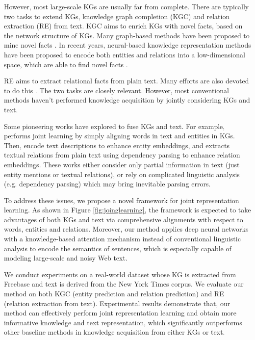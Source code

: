 \documentclass[11pt,a4paper]{article}
\begin{document}
However, most large-scale KGs are usually far from complete. There are typically two tasks to extend KGs, knowledge graph completion (KGC) and relation extraction (RE) from text. KGC aims to enrich KGs with novel facts, based on the network structure of KGs. Many graph-based methods have been proposed to mine novel facts \cite{lao2011random,lao2010relational}. In recent years, neural-based knowledge representation methods have been proposed to encode both entities and relations into a low-dimensional space, which are able to find novel facts \cite{bordes2013translating,wang2014transh,lin2015learning,ji2015knowledge,he2015learning,xiao2015transg,ji2016knowledge}. 

RE aims to extract relational facts from plain text. Many efforts are also devoted to do this \cite{surdeanu2012multi,riedel2013relation,min2013distant,zeng2014relation,zeng2015distant,lin2016neural,zeng2016incorporating}. The two tasks are closely relevant. However, most conventional methods haven't performed knowledge acquisition by jointly considering KGs and text.



Some pioneering works have explored to fuse KGs and text. For example,  performs joint learning by simply aligning words in text and entities in KGs. Then,  encode text descriptions to enhance entity embeddings, and  extracts textual relations from plain text using dependency parsing to enhance relation embeddings. These works either consider only partial information in text (just entity mentions or textual relations), or rely on complicated linguistic analysis (e.g. dependency parsing) which may bring inevitable parsing errors.

To address these issues, we propose a novel framework for joint representation learning. As shown in Figure \ref{fig:joinglearning}, the framework is expected to take advantages of both KGs and text via comprehensive alignments with respect to words, entities and relations. Moreover, our method applies deep neural networks with a knowledge-based attention mechanism instead of conventional linguistic analysis to encode the semantics of sentences, which is especially capable of modeling large-scale and noisy Web text. 

We conduct experiments on a real-world dataset whose KG is extracted from Freebase and text is derived from the New York Times corpus. We evaluate our method on both KGC (entity prediction and relation prediction) and RE (relation extraction from text). Experimental results demonstrate that, our method can effectively perform joint representation learning and obtain more informative knowledge and text representation, which significantly outperforms other baseline methods in knowledge acquisition from either KGs or text.
\end{document}

